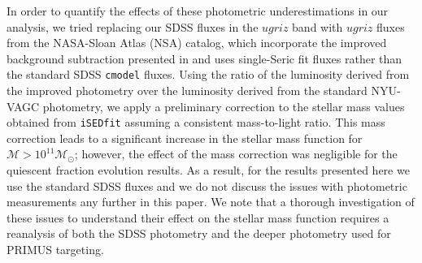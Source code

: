 \documentclass{emulateapj}
\begin{document}
In order to quantify the effects of these photometric underestimations
in our analysis, we tried replacing our SDSS fluxes in the $ugriz$
band with $ugriz$ fluxes from the NASA-Sloan Atlas (NSA) catalog,
which incorporate the improved background subtraction presented in
\cite{Blanton:2011aa} and uses single-Seric fit fluxes rather than the
standard SDSS \texttt{cmodel} fluxes. Using the ratio of the
luminosity derived from the improved photometry over the luminosity
derived from the standard NYU-VAGC photometry, we apply a preliminary
correction to the stellar mass values obtained from \texttt{iSEDfit}
assuming a consistent mass-to-light ratio. This mass correction leads
to a significant increase in the stellar mass function for
$\mathcal{M} > 10^{11} \mathcal{M}_{\odot}$; however, the effect of
the mass correction was negligible for the quiescent fraction
evolution results. As a result, for the results presented here we use
the standard SDSS fluxes and we do not discuss the issues with
photometric measurements any further in this paper. We note that a
thorough investigation of these issues to understand their effect on
the stellar mass function requires a reanalysis of both the SDSS
photometry and the deeper photometry used for PRIMUS targeting.
\end{document}
